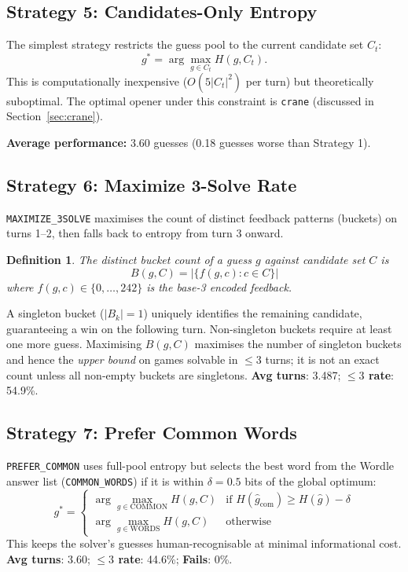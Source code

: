 \documentclass{article}
\newtheorem{definition}{Definition}
\begin{document}
\subsection{Strategy 5: Candidates-Only Entropy}

The simplest strategy restricts the guess pool to the current candidate set $C_t$:
\[
  g^* = \arg\max_{g \in C_t} H(g, C_t).
\]
This is computationally inexpensive ($O(5|C_t|^2)$ per turn) but theoretically
suboptimal. The optimal opener under this constraint is \texttt{crane}
(discussed in Section~\ref{sec:crane}).

\textbf{Average performance:} 3.60 guesses (0.18 guesses worse than Strategy 1).

\subsection{Strategy 6: Maximize 3-Solve Rate}
\label{sec:strategy6}

\texttt{MAXIMIZE\_3SOLVE} maximises the count of distinct feedback patterns (buckets)
on turns 1--2, then falls back to entropy from turn 3 onward.

\begin{definition}
The \emph{distinct bucket count} of a guess $g$ against candidate set $C$ is
\[
  B(g, C) = \left|\{f(g, c) : c \in C\}\right|
\]
where $f(g, c) \in \{0, \ldots, 242\}$ is the base-3 encoded feedback.
\end{definition}

A singleton bucket ($|B_k| = 1$) uniquely identifies the remaining candidate,
guaranteeing a win on the following turn. Non-singleton buckets require at least
one more guess. Maximising $B(g, C)$ maximises the number of singleton buckets
and hence the \emph{upper bound} on games solvable in $\leq 3$ turns; it is not
an exact count unless all non-empty buckets are singletons.
\textbf{Avg turns}: 3.487; \textbf{$\leq 3$ rate}: 54.9\%.

\subsection{Strategy 7: Prefer Common Words}
\label{sec:strategy7}

\texttt{PREFER\_COMMON} uses full-pool entropy but selects the best word from the
Wordle answer list (\texttt{COMMON\_WORDS}) if it is within $\delta = 0.5$ bits of
the global optimum:
\[
  g^* = \begin{cases}
    \arg\max_{g \in \text{COMMON}} H(g, C) & \text{if } H(\hat{g}_{\text{com}}) \geq H(\hat{g}) - \delta \\
    \arg\max_{g \in \text{WORDS}} H(g, C) & \text{otherwise}
  \end{cases}
\]
This keeps the solver's guesses human-recognisable at minimal informational cost.
\textbf{Avg turns}: 3.60; \textbf{$\leq 3$ rate}: 44.6\%; \textbf{Fails}: 0\%.
\end{document}
